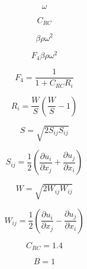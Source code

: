 

\begin{equation}
\omega
\end{equation}

\begin{equation}
C_{RC}
\end{equation}

\begin{equation}
\beta \rho \omega^2
\end{equation}

\begin{equation}
F_4 \beta \rho \omega^2
\end{equation}

\begin{equation}
F_4 = \frac{1}{1+C_{RC} R_i}
\end{equation}

\begin{equation}
R_i = \frac{W}{S} \left( \frac{W}{S} - 1 \right)
\end{equation}

\begin{equation}
S = \sqrt{2 S_{ij} S_{ij}}
\end{equation}

\begin{equation}
S_{ij} = \frac{1}{2} \left(\frac{\partial u_i}{\partial x_j} +
   \frac{\partial u_j}{\partial x_i} \right)
\end{equation}

\begin{equation}
W = \sqrt{2 W_{ij} W_{ij}}
\end{equation}

\begin{equation}
W_{ij} = \frac{1}{2} \left(\frac{\partial u_i}{\partial x_j} -
   \frac{\partial u_j}{\partial x_i} \right)
\end{equation}

\begin{equation}
C_{RC}=1.4
\end{equation}

\begin{equation}
B=1
\end{equation}


